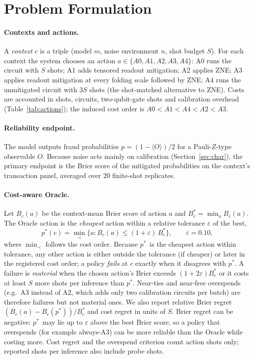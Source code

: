 \documentclass[11pt]{article}
\newcommand{\pstar}{$p^{*}$}
\begin{document}
\section{Problem Formulation}
\label{sec:formulation}

\paragraph{Contexts and actions.}
A \emph{context} $c$ is a triple (model $m$, noise environment $n$, shot budget $S$).
For each context the system chooses an action $a \in \{A0, A1, A2, A3, A4\}$:
A0 runs the circuit with $S$ shots; A1 adds tensored readout mitigation; A2 applies ZNE; A3 applies readout mitigation at every folding scale followed by ZNE; A4 runs the unmitigated circuit with $3S$ shots (the shot-matched alternative to ZNE).
Costs are accounted in shots, circuits, two-qubit-gate shots and calibration overhead (Table~\ref{tab:actions}); the induced cost order is $A0 < A1 < A4 < A2 < A3$.

\paragraph{Reliability endpoint.}
The model outputs fraud probabilities $p = (1-\langle O\rangle)/2$ for a Pauli-$Z$-type observable $O$.
Because noise acts mainly on calibration (Section~\ref{sec:char}), the primary endpoint is the Brier score \citep{brier1950verification} of the mitigated probabilities on the context's transaction panel, averaged over 20 finite-shot replicates.

\paragraph{Cost-aware Oracle.}
Let $B_c(a)$ be the context-mean Brier score of action $a$ and $B^{*}_c = \min_a B_c(a)$.
The Oracle action is the \emph{cheapest} action within a relative tolerance $\varepsilon$ of the best,
\begin{equation}
p^{*}(c) = \min_{\prec}\{a : B_c(a) \le (1+\varepsilon)\,B^{*}_c\}, \qquad \varepsilon = 0.10,
\end{equation}
where $\min_{\prec}$ follows the cost order.
Because \pstar\ is the cheapest action within tolerance, any other action is either outside the tolerance (if cheaper) or later in the registered cost order; a policy \emph{fails} at $c$ exactly when it disagrees with \pstar.
A failure is \emph{material} when the chosen action's Brier exceeds $(1+2\varepsilon)B^{*}_c$ or it costs at least $S$ more shots per inference than \pstar.
Near-ties and near-free overspends (e.g.\ A3 instead of A2, which adds only two calibration circuits per batch) are therefore failures but not material ones.
We also report relative Brier regret $(B_c(a)-B_c(p^{*}))/B^{*}_c$ and cost regret in units of $S$.
Brier regret can be negative: \pstar\ may lie up to $\varepsilon$ above the best Brier score, so a policy that overspends (for example always-A3) can be more reliable than the Oracle while costing more.
Cost regret and the overspend criterion count action shots only; reported shots per inference also include probe shots.
\end{document}
